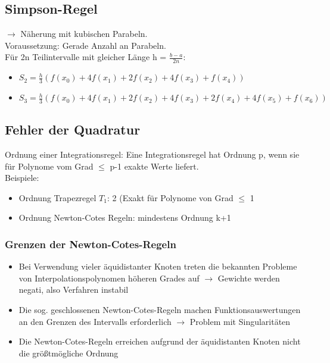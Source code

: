 \documentclass[10pt,landscape,a4paper]{article}
\begin{document}
\begin{multicols}{3}
\subsection{Simpson-Regel}
$\rightarrow$ Näherung mit kubischen Parabeln. \\
Voraussetzung: Gerade Anzahl an Parabeln. \\
Für 2n Teilintervalle mit gleicher Länge h = $\frac{b-a}{2n}$: \\
\begin{itemize}
	\setlength\itemsep{-0.2em}
	\item $S_2 = \frac{h}{3}(f(x_0) + 4f(x_1) + 2f(x_2) + 4f(x_3) + f(x_4))$
	\item $S_3 = \frac{h}{3} (f(x_0) + 4f(x_1) + 2f(x_2) + 4f(x_3) + 2f(x_4) + 4f(x_5) + f(x_6))$
\end{itemize}

\subsection{Fehler der Quadratur}

Ordnung einer Integrationsregel:
Eine Integrationsregel hat Ordnung p, wenn sie für Polynome vom Grad $\leq$ p-1 exakte Werte liefert. \\
Beispiele:
\begin{itemize}
	\setlength\itemsep{-0.2em}
	\item Ordnung Trapezregel $T_1$: 2 (Exakt für Polynome von Grad $\leq$ 1
	\item Ordnung Newton-Cotes Regeln: mindestens Ordnung k+1
\end{itemize}

\subsubsection{Grenzen der Newton-Cotes-Regeln}
\begin{itemize}
	\setlength\itemsep{-0.2em}
	\item Bei Verwendung vieler äquidistanter Knoten treten die bekannten Probleme von Interpolationspolynomen höheren Grades auf $\rightarrow$ Gewichte werden negati, also Verfahren instabil
	\item Die sog. geschlossenen Newton-Cotes-Regeln machen Funktionsauswertungen an den Grenzen des Intervalls erforderlich $\rightarrow$ Problem mit Singularitäten
	\item Die Newton-Cotes-Regeln erreichen aufgrund der äquidistanten Knoten nicht die größtmögliche Ordnung
\end{itemize}


\end{multicols}
\end{document}

